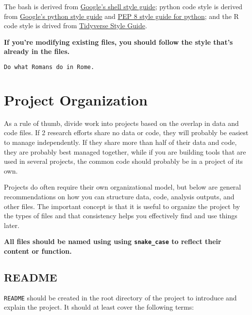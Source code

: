 \documentclass[
]{book}
\begin{document}
The bash is derived from
\href{https://google.github.io/styleguide/shellguide.html}{Google's shell style guide};
python code style is derived from
\href{https://www.python.org/dev/peps/pep-0008/}{Google's python style guide} and
\href{https://www.python.org/dev/peps/pep-0008/}{PEP 8 style guide for python}; and
the R code style is drived from
\href{https://style.tidyverse.org/}{Tidyverse Style Guide}.

\textbf{If you're modifying existing files, you should follow the style that's already
in the files.}

\begin{verbatim}
Do what Romans do in Rome.
\end{verbatim}

\hypertarget{project-organization-1}{%
\chapter{Project Organization}\label{project-organization-1}}

As a rule of thumb, divide work into projects based on the overlap in data and
code files. If 2 research efforts share no data or code, they will probably be
easiest to manage independently. If they share more than half of their data and
code, they are probably best managed together, while if you are building tools
that are used in several projects, the common code should probably be in a
project of its own.

Projects do often require their own organizational model, but below are general
recommendations on how you can structure data, code, analysis outputs, and other
files. The important concept is that it is useful to organize the project by
the types of files and that consistency helps you effectively find and use
things later.

\textbf{All files should be named using using \texttt{snake\_case} to reflect their content or
function.}

\hypertarget{readme}{%
\section{README}\label{readme}}

\texttt{README} should be created in the root directory of the project to introduce
and explain the project. It should at least cover the following terms:
\end{document}
